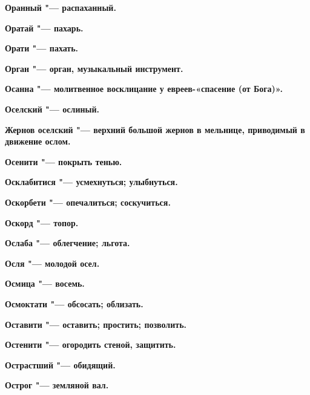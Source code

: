 \begin{mymulticols}{2}
\bfseries Оранный\normalfont{} "--- распаханный. 




\bfseries Оратай\normalfont{} "--- пахарь. 




\bfseries Орати\normalfont{} "--- пахать. 




\bfseries Орган\normalfont{} "--- орган, музыкальный инструмент. 




\bfseries Осанна\normalfont{} "--- молитвенное восклицание у евреев-«спасение (от Бога)». 




\bfseries Оселский\normalfont{} "--- ослиный. 




\bfseries Жернов оселский\normalfont{} "--- верхний большой жернов в мельнице, приводимый в движение ослом. 




\bfseries Осенити\normalfont{} "--- покрыть тенью. 




\bfseries Осклабитися\normalfont{} "--- усмехнуться; улыбнуться. 




\bfseries Оскорбети\normalfont{} "--- опечалиться; соскучиться. 




\bfseries Оскорд\normalfont{} "--- топор. 




\bfseries Ослаба\normalfont{} "--- облегчение; льгота. 




\bfseries Осля\normalfont{} "--- молодой осел. 




\bfseries Осмица\normalfont{} "--- восемь. 




\bfseries Осмоктати\normalfont{} "--- обсосать; облизать. 




\bfseries Оставити\normalfont{} "--- оставить; простить; позволить. 




\bfseries Остенити\normalfont{} "--- огородить стеной, защитить. 




\bfseries Острастший\normalfont{} "--- обидящий. 




\bfseries Острог\normalfont{} "--- земляной вал. 





\end{mymulticols}
